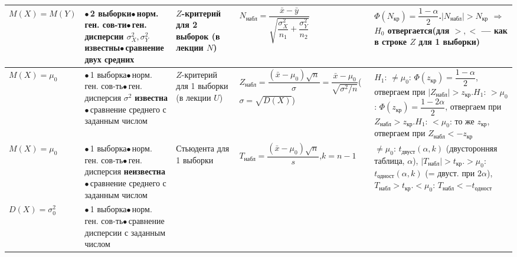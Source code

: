 \documentclass[a4paper,landscape,10pt]{extarticle}
\newcommand{\kr}{\text{кр}}\newcommand{\nab}{\text{набл}}
\newcommand{\bl}{$\bullet$\,}
\begin{document}
\begin{tabular}{|P{2.3cm}|P{4.6cm}|P{2.2cm}|P{7.1cm}|P{9.2cm}|}
$M(X)=M(Y)$
&\newline\bl 2 выборки\newline\bl норм. ген. сов-ти\newline\bl ген. дисперсии $\sigma_X^2,\sigma_Y^2$ \textbf{известны}\newline\bl сравнение двух средних
& $Z$-критерий для 2 выборок (в лекции $N$)
& $N_\nab=\dfrac{\bar x-\bar y}{\sqrt{\dfrac{\sigma_X^2}{n_1}+\dfrac{\sigma_Y^2}{n_2}}}$
& $\Phi(N_\kr)=\dfrac{1-\alpha}{2}$.\newline $|N_\nab|>N_\kr$ $\Rightarrow$ $H_0$ отвергается\newline (для $>,<$ --- как в строке $Z$ для 1 выборки) \\\hline
$M(X)=\mu_0$
&\newline\bl 1 выборка\newline\bl норм. ген. сов-ть\newline\bl ген. дисперсия $\sigma^2$ \textbf{известна}\newline\bl сравнение среднего с заданным числом
& $Z$-критерий для 1 выборки (в лекции $U$)
& $Z_\nab=\dfrac{(\bar x-\mu_0)\sqrt n}{\sigma}=\dfrac{\bar x-\mu_0}{\sqrt{\sigma^2/n}}$\newline ($\sigma=\sqrt{D(X)}$)
& $H_1$: $\ne\mu_0$: $\Phi(z_\kr)=\dfrac{1-\alpha}{2}$, отвергаем при $|Z_\nab|>z_\kr$.\newline $H_1$: $>\mu_0$: $\Phi(z_\kr)=\dfrac{1-2\alpha}{2}$, отвергаем при $Z_\nab>z_\kr$.\newline $H_1$: $<\mu_0$: то же $z_\kr$, отвергаем при $Z_\nab<-z_\kr$ \\\hline
$M(X)=\mu_0$
&\newline\bl 1 выборка\newline\bl норм. ген. сов-ть\newline\bl ген. дисперсия \textbf{неизвестна}\newline\bl сравнение среднего с заданным числом
& Стьюдента для 1 выборки
& $T_\nab=\dfrac{(\bar x-\mu_0)\sqrt n}{s}$,\quad $k=n-1$
& $\ne\mu_0$: $t_{\text{двуст}}(\alpha,k)$ (двусторонняя таблица, $\alpha$), $|T_\nab|>t_\kr$.\newline $>\mu_0$: $t_{\text{одност}}(\alpha,k)$ (= двуст. при $2\alpha$), $T_\nab>t_\kr$.\newline $<\mu_0$: $T_\nab<-t_{\text{одност}}$ \\\hline
$D(X)=\sigma_0^2$
&\newline\bl 1 выборка\newline\bl норм. ген. сов-ть\newline\bl сравнение дисперсии с заданным числом

\end{tabular}
\end{document}
